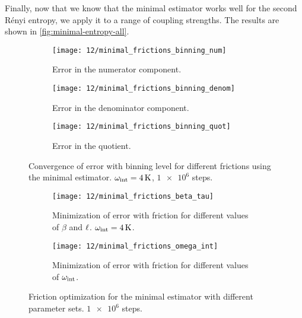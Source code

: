 Finally, now that we know that the minimal estimator works well for the second Rényi entropy, we apply it to a range of coupling strengths.
The results are shown in \cref{fig:minimal-entropy-all}.

\begin{figure}
	\setlength{\figspacing}{5 mm}
	\centering
	\begin{subfigure}[b]{\textwidth}
		\texttt{[image: 12/minimal\_frictions\_binning\_num]}
		\caption{
			Error in the numerator component.
		}
		\vspace{\figspacing}
	\end{subfigure}
	\begin{subfigure}[b]{\textwidth}
		\texttt{[image: 12/minimal\_frictions\_binning\_denom]}
		\caption{
			Error in the denominator component.
		}
		\vspace{\figspacing}
	\end{subfigure}
	\begin{subfigure}[b]{\textwidth}
		\texttt{[image: 12/minimal\_frictions\_binning\_quot]}
		\caption{
			Error in the quotient.
		}
	\end{subfigure}
	\caption[
		Error convergence for minimal estimator
	]{
		Convergence of error with binning level for different frictions using the minimal estimator.
		$\omega_\text{int} = \SI{4}{\kelvin}$, $\num{1e6}$ steps.
	}
	\label{fig:minimal-frictions-binning}
\end{figure}

\begin{figure}
	\setlength{\figspacing}{5 mm}
	\centering
	\begin{subfigure}[b]{\textwidth}
		\texttt{[image: 12/minimal\_frictions\_beta\_tau]}
		\caption{
			Minimization of error with friction for different values of $\beta$ and $\ell$.
			$\omega_\text{int} = \SI{4}{\kelvin}$.
		}
		\vspace{\figspacing}
	\end{subfigure}
	\begin{subfigure}[b]{\textwidth}
		\texttt{[image: 12/minimal\_frictions\_omega\_int]}
		\caption{
			Minimization of error with friction for different values of $\omega_\text{int}$.
		}
	\end{subfigure}
	\caption[
		Friction optimization for minimal estimator
	]{
		Friction optimization for the minimal estimator with different parameter sets.
		$\num{1e6}$ steps.
	}
	\label{fig:minimal-frictions-parameters}
\end{figure}

